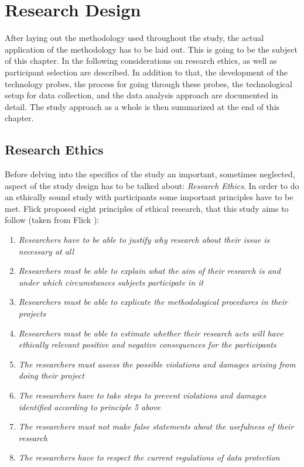 \section{Research Design}

After laying out the methodology used throughout the study, the actual application of the methodology has to be laid out. This is going to be the subject of this chapter. In the following considerations on research ethics, as well as participant selection are described. In addition to that, the development of the technology probes, the process for going through these probes, the technological setup for data collection, and the data analysis approach are documented in detail. The study approach as a whole is then summarized at the end of this chapter.

\subsection{Research Ethics}

Before delving into the specifics of the study an important, sometimes neglected, aspect of the study design has to be talked about: \textit{Research Ethics}. In order to do an ethically sound study with participants some important principles have to be met. Flick proposed eight principles of ethical research, that this study aims to follow (taken from Flick \cite[p. 135]{flick2018introduction}):

\small{
  \begin{enumerate}
    \item{\textit{Researchers have to be able to justify why research about their issue is necessary at all}}
    \item{\textit{Researchers must be able to explain what the aim of their research is and under which circumstances subjects participate in it}}
    \item{\textit{Researchers must be able to explicate the methodological procedures in their projects}}
    \item{\textit{Researchers must be able to estimate whether their research acts will have ethically relevant positive and negative consequences for the participants}}
    \item{\textit{The researchers must assess the possible violations and damages arising from doing their project}}
    \item{\textit{The researchers have to take steps to prevent violations and damages identified according to principle 5 above}}
    \item{\textit{The researchers must not make false statements about the usefulness of their research}}
    \item{\textit{The researchers have to respect the current regulations of data protection}}
  \end{enumerate}
}

